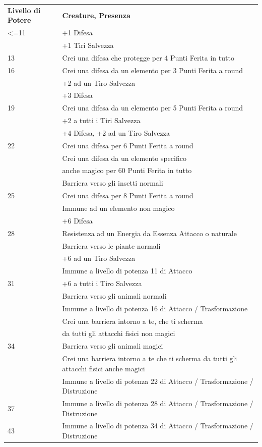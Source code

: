 \documentclass[a4paper,11pt,twoside,openany]{book}
\begin{document}
\bigskip
\begin{tabularx}{0.95\textwidth}{lX}
	\toprule
	\textbf{Livello di Potere} & \textbf{Creature, Presenza}\\
	<=11     & +1 Difesa  \\
	         & +1 Tiri Salvezza \\
	13       & Crei una difesa che protegge per 4 Punti Ferita in tutto \\
	16       & Crei una difesa da un elemento per 3 Punti Ferita a round\\
             & +2 ad un Tiro Salvezza\\
             & +3 Difesa\\
	19       & Crei una difesa da un elemento per 5 Punti Ferita a round\\
             & +2 a tutti i Tiri Salvezza   \\
             & +4 Difesa, +2 ad un Tiro Salvezza \\
	22       & Crei una difesa per 6 Punti Ferita a round \\
             & Crei una difesa da un elemento specifico \\
             & anche magico per 60 Punti Ferita in tutto \\
             & Barriera verso gli insetti normali \\
	25       & Crei una difesa per 8 Punti Ferita a round \\
             & Immune ad un elemento non magico \\
             & +6 Difesa \\
	28       & Resistenza ad un Energia da Essenza Attacco o naturale \\
             & Barriera verso le piante normali\\
             & +6 ad un Tiro Salvezza\\
             & Immune a livello di potenza 11 di Attacco\\
	31       & +6 a tutti i Tiro Salvezza\\
             & Barriera verso gli animali normali\\
             & Immune a livello di potenza 16 di Attacco / Trasformazione\\
             & Crei una barriera intorno a te, che ti scherma\\
             & da tutti gli attacchi fisici non magici\\
	34       & Barriera verso gli animali magici\\
	         & Crei una barriera intorno a te che ti scherma da tutti gli attacchi fisici anche magici\\
             & Immune a livello di potenza 22 di Attacco / Trasformazione / Distruzione \\
	37       & Immune a livello di potenza 28 di Attacco / Trasformazione / Distruzione \\
	43       & Immune a livello di potenza 34 di Attacco / Trasformazione / Distruzione \\
\end{tabularx}
\end{document}
